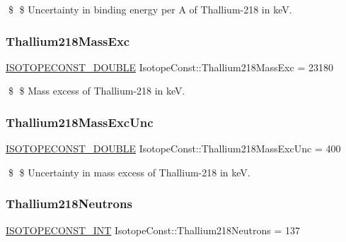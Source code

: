 \$ \$ Uncertainty in binding energy per A of Thallium-\/218 in keV. \mbox{\label{group___isotope_const-_thallium-_tl218_ga370a5bffe31e4c31f186e01633d80a0d}} 
\subsubsection{\texorpdfstring{Thallium218\+Mass\+Exc}{Thallium218MassExc}}
{\footnotesize\ttfamily \mbox{\hyperlink{group___isotope_const-_macros_ga8f45a7272ce02c0b4c65c44636ed719a}{I\+S\+O\+T\+O\+P\+E\+C\+O\+N\+S\+T\+\_\+\+D\+O\+U\+B\+LE}} Isotope\+Const\+::\+Thallium218\+Mass\+Exc = 23180}

\$ \$ Mass excess of Thallium-\/218 in keV. \mbox{\label{group___isotope_const-_thallium-_tl218_ga85aa24c43161b3b96ee8105793f1ddcb}} 
\subsubsection{\texorpdfstring{Thallium218\+Mass\+Exc\+Unc}{Thallium218MassExcUnc}}
{\footnotesize\ttfamily \mbox{\hyperlink{group___isotope_const-_macros_ga8f45a7272ce02c0b4c65c44636ed719a}{I\+S\+O\+T\+O\+P\+E\+C\+O\+N\+S\+T\+\_\+\+D\+O\+U\+B\+LE}} Isotope\+Const\+::\+Thallium218\+Mass\+Exc\+Unc = 400}

\$ \$ Uncertainty in mass excess of Thallium-\/218 in keV. \mbox{\label{group___isotope_const-_thallium-_tl218_gad42932116ffbcd5069f2e24c1333a51c}} 
\subsubsection{\texorpdfstring{Thallium218\+Neutrons}{Thallium218Neutrons}}
{\footnotesize\ttfamily \mbox{\hyperlink{group___isotope_const-_macros_ga5f18360b3e99483a35c32d789e62621c}{I\+S\+O\+T\+O\+P\+E\+C\+O\+N\+S\+T\+\_\+\+I\+NT}} Isotope\+Const\+::\+Thallium218\+Neutrons = 137}

